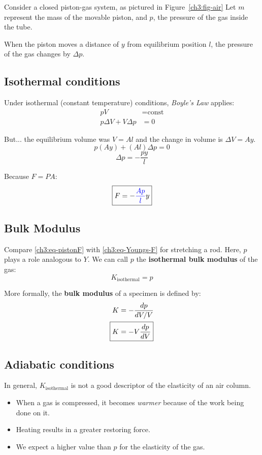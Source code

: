 \documentclass[11pt,letterpaper,titlepage,oneside]{book}
\newcommand{\kcol}[1]{\textcolor{blue}{#1}}
\begin{document}
Consider a closed piston-gas system, as pictured in Figure~\ref{ch3:fig-air} Let $m$ represent the mass of the movable piston, and $p$, the pressure of the gas inside the tube.

When the piston moves a distance of $y$ from equilibrium position $l$, the pressure of the gas changes by $\Delta p$.

\subsection{Isothermal conditions}
Under {isothermal} (constant temperature) conditions, \emph{Boyle's Law} applies:
\begin{align*}
pV &= \text{const} \\
p\Delta V + V\Delta p &= 0 \tag*{(cf. the product rule for differentiation)}
\end{align*}

But... the equilibrium volume was $V = Al$ and the change in volume is $\Delta V = Ay$.
\[ p(Ay) + (Al)\Delta p = 0 \]
\[ \Delta p = -\frac{py}{l} \]

Because $F=PA$:
\begin{equation}
	\boxed{F=-\kcol{\frac{Ap}{l}} y } \label{ch3:eq-pistonF}
\end{equation}

\subsection{Bulk Modulus} \label{ch3:sec-bulk-modulus}

Compare \eqref{ch3:eq-pistonF} with \eqref{ch3:eq-Youngs-F} for stretching a rod. Here, $p$ plays a role analogous to $Y$. We can call $p$ the \textbf{isothermal bulk modulus} of the gas:
\begin{equation*}
	K_\text{isothermal} = p
\end{equation*}

More formally, the \textbf{bulk modulus} of a specimen is defined by:
\begin{align*}
	K &= -\frac{dp}{dV/V} \notag \\
	\Aboxed{K &= -V\frac{dp}{dV}}
\end{align*}

\subsection{Adiabatic conditions}

In general, $K_\text{isothermal}$ is not a good descriptor of the elasticity of an air column.
\begin{itemize}
	\item When a gas is compressed, it becomes \emph{warmer} because of the work being done on it.
	\item Heating results in a greater restoring force.
	\item We expect a higher value than $p$ for the elasticity of the gas.
\end{itemize}
\end{document}
